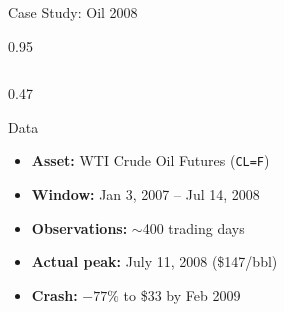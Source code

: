 \documentclass[9pt, aspectratio=169, t]{beamer}
\begin{document}
\begin{frame}{Case Study: Oil 2008}
    \begin{cminipage}{0.95\textwidth}
    {\footnotesize
    \begin{columns}[T]
        \begin{column}{0.47\textwidth}
            \begin{block}{Data}
                \begin{itemize}\setlength{\itemsep}{0pt}
                    \item \textbf{Asset:} WTI Crude Oil Futures (\texttt{CL=F})
                    \item \textbf{Window:} Jan 3, 2007 -- Jul 14, 2008
                    \item \textbf{Observations:} $\sim$400 trading days
                    \item \textbf{Actual peak:} July 11, 2008 (\$147/bbl)
                    \item \textbf{Crash:} $-77\%$ to \$33 by Feb 2009
                \end{itemize}
            \end{block}


\end{column}
\end{columns}}
\end{cminipage}
\end{frame}
\end{document}
